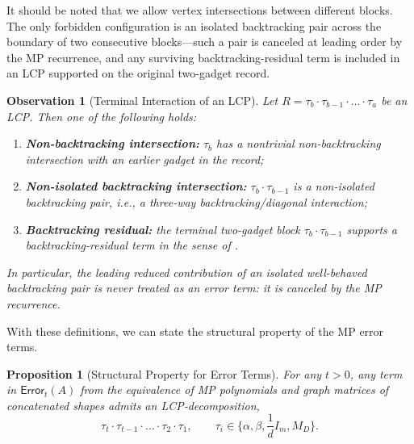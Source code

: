 \documentclass[12pt]{article}
\newtheorem{proposition}[theorem]{Proposition}
\newtheorem{observation}[theorem]{Observation}
\newcommand{\fp}{\mathsf{P}}
\newcommand{\q}{\mathfrak q}
\begin{document}
It should be noted that we allow vertex intersections between different blocks. The only forbidden
configuration is an isolated backtracking pair across the
boundary of two consecutive blocks---such a pair is canceled at leading
order by the MP recurrence, and any surviving backtracking-residual term is
included in an LCP supported on the original two-gadget record.

\begin{observation}[Terminal Interaction of an LCP]
\label{obs:lcp-terminal-not-isolated-backtracking}
Let
\(
    R
    =
    \tau_b\cdot\tau_{b-1}\cdot\dots\cdot\tau_a
\)
be an LCP. Then one of the following holds:
\begin{enumerate}
    \item \textbf{Non-backtracking intersection:}
    \(\tau_b\) has a nontrivial non-backtracking intersection with an
    earlier gadget in the record;

    \item \textbf{Non-isolated backtracking intersection:}
    \(\tau_b\cdot\tau_{b-1}\) is a non-isolated backtracking pair, i.e.,
    a three-way backtracking/diagonal interaction;

    \item \textbf{Backtracking residual:}
    the terminal two-gadget block
    \(\tau_b\cdot\tau_{b-1}\) supports a backtracking-residual term in the
    sense of .
\end{enumerate}
In particular, the leading reduced contribution of an isolated
well-behaved backtracking pair is never treated as an error term: it is
canceled by the MP recurrence.
\end{observation}

With these definitions, we can state the structural property of the MP
error terms.

\begin{proposition}[Structural Property for Error Terms]
\label{prop:error-term-A-equivalence}
For any $t>0$, any term in \(\mathsf{Error}_t(A)\) from the equivalence of MP polynomials and graph matrices of concatenated shapes admits an LCP-decomposition,
\[
    \tau_t\cdot\tau_{t-1}\cdot\dots\cdot\tau_2\cdot\tau_1,
    \qquad
    \tau_i\in \{\alpha,\beta, \frac{1}{d} I_m, M_D\}.
\]
\end{proposition}
\end{document}

